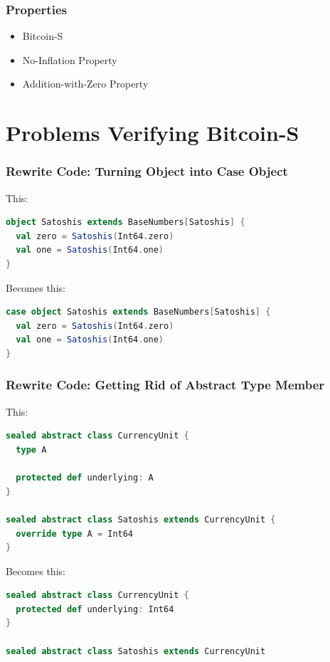 \documentclass{beamer}
\begin{document}
\begin{frame}
\frametitle{Properties}
\begin{itemize}
  \item Bitcoin-S
  \item No-Inflation Property
  \item Addition-with-Zero Property
\end{itemize}
\end{frame}


\section{Problems Verifying Bitcoin-S}


\begin{frame}[fragile]
\frametitle{Rewrite Code: Turning Object into Case Object}
This:
\begin{lstlisting}[language=Scala]
object Satoshis extends BaseNumbers[Satoshis] {
  val zero = Satoshis(Int64.zero)
  val one = Satoshis(Int64.one)
}
\end{lstlisting}

Becomes this:
\begin{lstlisting}[language=Scala]
case object Satoshis extends BaseNumbers[Satoshis] {
  val zero = Satoshis(Int64.zero)
  val one = Satoshis(Int64.one)
}
\end{lstlisting}
\end{frame}


\begin{frame}[fragile]
\frametitle{Rewrite Code: Getting Rid of Abstract Type Member}
This:
\begin{lstlisting}[language=Scala]
sealed abstract class CurrencyUnit {
  type A

  protected def underlying: A
}

sealed abstract class Satoshis extends CurrencyUnit {
  override type A = Int64
}
\end{lstlisting}

Becomes this:
\begin{lstlisting}[language=Scala]
sealed abstract class CurrencyUnit {
  protected def underlying: Int64
}

sealed abstract class Satoshis extends CurrencyUnit
\end{lstlisting}
\end{frame}
\end{document}
